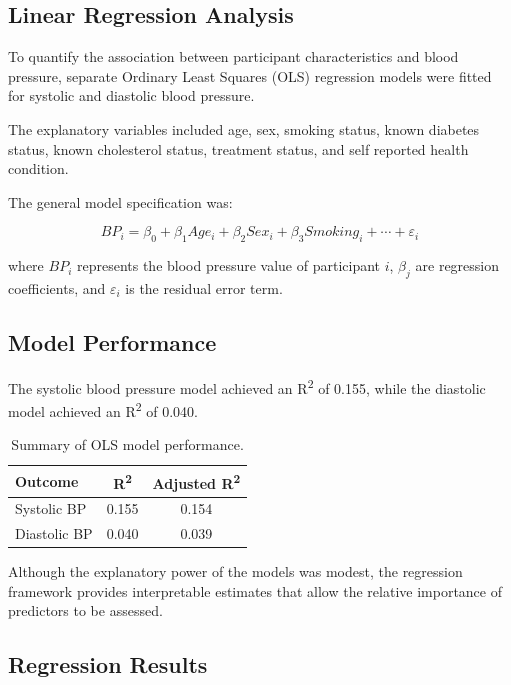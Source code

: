 \documentclass[12pt,a4paper]{article}
\begin{document}
\subsection{Linear Regression Analysis}

To quantify the association between participant characteristics and blood pressure, separate Ordinary Least Squares (OLS) regression models were fitted for systolic and diastolic blood pressure.

The explanatory variables included age, sex, smoking status, known diabetes status, known cholesterol status, treatment status, and self reported health condition.

The general model specification was:

\[
BP_i = \beta_0 + \beta_1 Age_i + \beta_2 Sex_i + \beta_3 Smoking_i + \cdots + \varepsilon_i
\]

where \(BP_i\) represents the blood pressure value of participant \(i\), \(\beta_j\) are regression coefficients, and \(\varepsilon_i\) is the residual error term.

\subsection{Model Performance}

The systolic blood pressure model achieved an R\textsuperscript{2} of 0.155, while the diastolic model achieved an R\textsuperscript{2} of 0.040.

\begin{table}[H]
\centering
\caption{Summary of OLS model performance.}
\label{tab:ols_performance}
\begin{tabular}{lcc}
\toprule
Outcome & R\textsuperscript{2} & Adjusted R\textsuperscript{2} \\
\midrule
Systolic BP & 0.155 & 0.154 \\
Diastolic BP & 0.040 & 0.039 \\
\bottomrule
\end{tabular}
\end{table}

Although the explanatory power of the models was modest, the regression framework provides interpretable estimates that allow the relative importance of predictors to be assessed.

\subsection{Regression Results}
\end{document}
